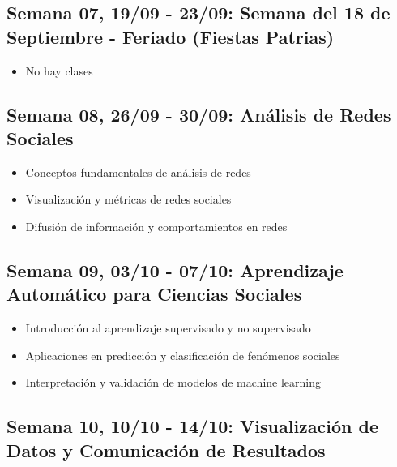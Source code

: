 \documentclass[11pt,letter,]{article}
\providecommand{\tightlist}{%
  \setlength{\itemsep}{0pt}\setlength{\parskip}{0pt}}
\begin{document}
\hypertarget{semana-07-1909---2309-semana-del-18-de-septiembre---feriado-fiestas-patrias}{%
\subsection{Semana 07, 19/09 - 23/09: Semana del 18 de Septiembre -
Feriado (Fiestas
Patrias)}\label{semana-07-1909---2309-semana-del-18-de-septiembre---feriado-fiestas-patrias}}

\begin{itemize}
\tightlist
\item
  No hay clases
\end{itemize}

\hypertarget{semana-08-2609---3009-anuxe1lisis-de-redes-sociales}{%
\subsection{Semana 08, 26/09 - 30/09: Análisis de Redes
Sociales}\label{semana-08-2609---3009-anuxe1lisis-de-redes-sociales}}

\begin{itemize}
\tightlist
\item
  Conceptos fundamentales de análisis de redes
\item
  Visualización y métricas de redes sociales
\item
  Difusión de información y comportamientos en redes
\end{itemize}

\hypertarget{semana-09-0310---0710-aprendizaje-automuxe1tico-para-ciencias-sociales}{%
\subsection{Semana 09, 03/10 - 07/10: Aprendizaje Automático para
Ciencias
Sociales}\label{semana-09-0310---0710-aprendizaje-automuxe1tico-para-ciencias-sociales}}

\begin{itemize}
\tightlist
\item
  Introducción al aprendizaje supervisado y no supervisado
\item
  Aplicaciones en predicción y clasificación de fenómenos sociales
\item
  Interpretación y validación de modelos de machine learning
\end{itemize}

\hypertarget{semana-10-1010---1410-visualizaciuxf3n-de-datos-y-comunicaciuxf3n-de-resultados}{%
\subsection{Semana 10, 10/10 - 14/10: Visualización de Datos y
Comunicación de
Resultados}\label{semana-10-1010---1410-visualizaciuxf3n-de-datos-y-comunicaciuxf3n-de-resultados}}
\end{document}
